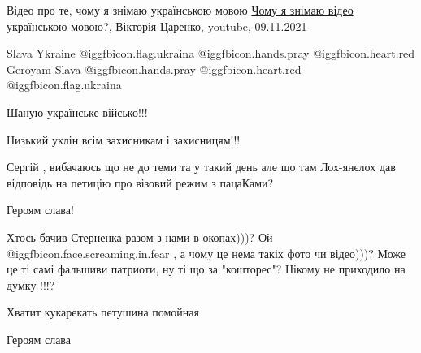 \begin{itemize}
Відео про те, чому я знімаю українською мовою
\href{https://www.youtube.com/watch?v=OG6BEqhPfTY}{%
Чому я знімаю відео українською мовою?, Вікторія Царенко, youtube, 09.11.2021%
}


Slava Ykraine @igg{fbicon.flag.ukraina} @igg{fbicon.hands.pray}
@igg{fbicon.heart.red} Geroyam Slava @igg{fbicon.hands.pray}
@igg{fbicon.heart.red} @igg{fbicon.flag.ukraina}

Шаную українське військо!!!

Низький уклін всім захисникам і захисницям!!!


Сергій , вибачаюсь що не до теми та у такий день але що там Лох-янєлох дав
відповідь на петицію про візовий режим з пацаКами?

Героям слава!


Хтось бачив Стерненка разом з нами в окопах)))? Ой  @igg{fbicon.face.screaming.in.fear} , а чому це нема такіх
фото чи відео)))? Може це ті самі фальшиви патриоти, ну ті що за "кошторес"?
Нікому не приходило на думку !!!?


Хватит кукарекать петушина помойная

Героям слава


\end{itemize} %
